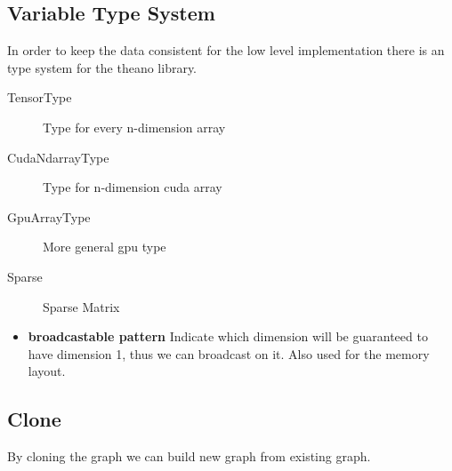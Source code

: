 \documentclass[11pt]{article}
\begin{document}
\subsection*{Variable Type System}
\label{sec:orgheadline8}
In order to keep the data consistent for the low level implementation there is an type system for the theano library. 
\begin{description}
\item[{TensorType}] Type for every n-dimension array
\item[{CudaNdarrayType}] Type for n-dimension cuda array
\item[{GpuArrayType}] More general gpu type
\item[{Sparse}] Sparse Matrix
\end{description}
\begin{itemize}
\item \textbf{broadcastable pattern}
\label{sec:orgheadline7}
Indicate which dimension will be guaranteed to have dimension 1, thus we can broadcast on it. Also used for the memory layout.
\end{itemize}
\subsection*{Clone}
\label{sec:orgheadline9}
By cloning the graph we can build new graph from existing graph.
\end{document}
